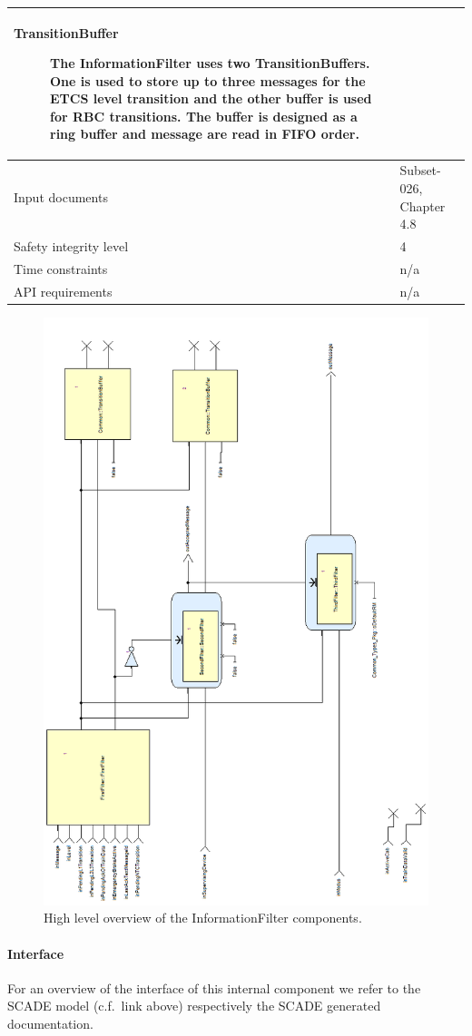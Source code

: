 \begin{longtable}{p{}p{}}
\begin{description}
\item[TransitionBuffer] The InformationFilter uses two
TransitionBuffers. One is used to store up to three messages for the
ETCS level transition and the other buffer is used for RBC
transitions. The buffer is designed as a ring buffer and message are
read in FIFO order.
\end{description} \\
\midrule
Input documents	& 
  Subset-026, Chapter 4.8 \\
\midrule
Safety integrity level	& 4 \\
\midrule
Time constraints		& n/a \\
\midrule
API requirements 		& n/a \\
\bottomrule
\end{longtable}

\begin{figure}
\centering
\includegraphics [width=\textwidth]{images/informationfilter-high-level-rot.png}
\caption{High level overview of the InformationFilter components.}
\label{fig:InformationFilterHighLevel}
\end{figure}

\paragraph{Interface}

For an overview of the interface of this internal component we refer to the SCADE model (c.f.~link above) respectively the SCADE generated documentation.